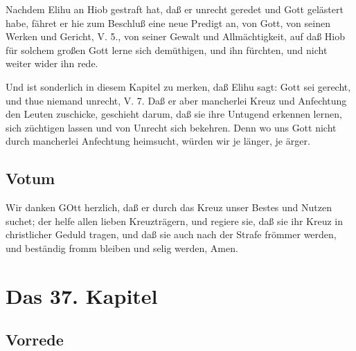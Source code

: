 Nachdem Elihu an Hiob gestraft hat, daß er unrecht geredet und Gott gelästert habe, fähret er hie zum Beschluß eine neue Predigt an, von Gott, von seinen Werken und Gericht, V. 5., von seiner Gewalt und Allmächtigkeit, auf daß Hiob für solchem großen Gott lerne sich demüthigen, und ihn fürchten, und nicht weiter wider ihn rede.

Und ist sonderlich in diesem Kapitel zu merken, daß Elihu sagt: Gott sei gerecht, und thue niemand unrecht, V. 7. Daß er aber mancherlei Kreuz und Anfechtung den Leuten zuschicke, geschieht darum, daß sie ihre Untugend erkennen lernen, sich züchtigen lassen und von Unrecht sich bekehren. Denn wo uns Gott nicht durch mancherlei Anfechtung heimsucht, würden wir je länger, je ärger.

\section{Votum}

Wir danken GOtt herzlich, daß er durch das Kreuz unser Bestes und Nutzen suchet; der helfe allen lieben Kreuzträgern, und regiere sie, daß sie ihr Kreuz in christlicher Geduld tragen, und daß sie auch nach der Strafe frömmer werden, und beständig fromm bleiben und selig werden, Amen.

\chapter{Das 37. Kapitel}

\section{Vorrede}


